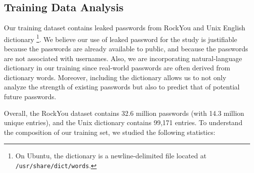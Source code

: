 \documentclass{article} %
\theoremstyle{definition}
\theoremstyle{theorem}
\theoremstyle{remark}
\theoremstyle{remark}
\begin{document}
\subsection{Training Data Analysis}     \label{sect:data-analysis}
\par\quad Our training dataset contains leaked passwords from RockYou and Unix English dictionary \footnote{On Ubuntu, the dictionary is a newline-delimited file located at \texttt{/usr/share/dict/words}.}. We believe our use of leaked password for the study is justifiable because the passwords are already available to public, and because the passwords are not associated with usernames. Also, we are incorporating natural-language dictionary in our training since real-world passwords are often derived from dictionary words. Moreover, including the dictionary allows us to not only analyze the strength of existing passwords but also to predict that of potential future passwords.

\par\quad Overall, the RockYou dataset contains 32.6 million passwords (with 14.3 million unique entries), and the Unix dictionary contains 99,171 entries. To understand the composition of our training set, we studied the following statistics:
\end{document}
